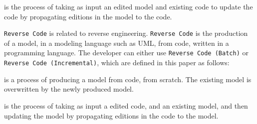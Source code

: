 


\begin{definition}
	 is the process
	of taking as input an edited model and existing code to update the code by propagating
	editions in the model to the code.
\end{definition}

\texttt{Reverse Code} is related to reverse engineering.
\texttt{Reverse Code} is the production of a model, in a modeling language such as UML, from code, written in a programming language.
The developer can either use \texttt{Reverse Code (Batch)} or \texttt{Reverse Code (Incremental)}, which are defined in this paper as follows:

\begin{definition}
	 is a process of producing a model from code, from scratch.
	The existing model is overwritten by the newly produced model.
\end{definition}

\begin{definition}
	 is the process of taking as
	input a edited code, and an existing model, and then updating the model by propagating
	editions in the code to the model.
\end{definition}


